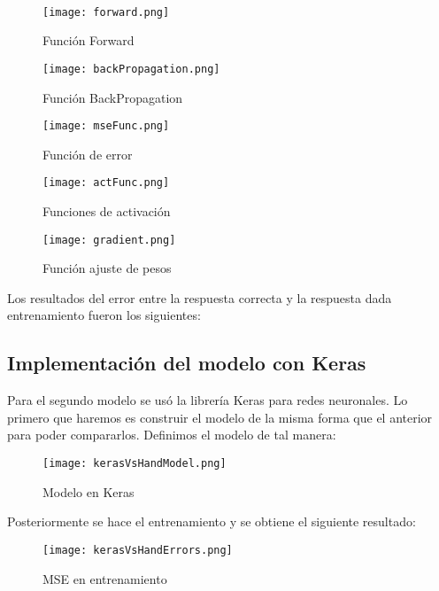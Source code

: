 \documentclass[journal]{IEEEtran}
\begin{document}
\\ 
\begin{figure} [H]
    \centering
    \texttt{[image: forward.png]}
    \caption{Función Forward}
    \label{2}
\end{figure}
\begin{figure} [H]
    \centering
    \texttt{[image: backPropagation.png]}
    \caption{Función BackPropagation}
    \label{3}
\end{figure}
\begin{figure} [H]
    \centering
    \texttt{[image: mseFunc.png]}
    \caption{Función de error}
    \label{4}
\end{figure}
\begin{figure} [H]
    \centering
    \texttt{[image: actFunc.png]}
    \caption{Funciones de activación}
    \label{5}
\end{figure}
\begin{figure} [H]
    \centering
    \texttt{[image: gradient.png]}
    \caption{Función ajuste de pesos}
    \label{6}
\end{figure}

Los resultados del error entre la respuesta correcta y la respuesta dada entrenamiento fueron los siguientes:

\subsection{Implementación del modelo con Keras}
Para el segundo modelo se usó la librería Keras para redes neuronales. Lo primero que haremos es construir el modelo de la misma forma que el anterior para poder compararlos. Definimos el modelo de tal manera:\\
\begin{figure} [H]
    \centering
    \texttt{[image: kerasVsHandModel.png]}
    \caption{Modelo en Keras}
    \label{7}
\end{figure}
Posteriormente se hace el entrenamiento y se obtiene el siguiente resultado: 
\begin{figure} [H]
    \centering
    \texttt{[image: kerasVsHandErrors.png]}
    \caption{MSE en entrenamiento}
    \label{8}
\end{figure}
\end{document}
